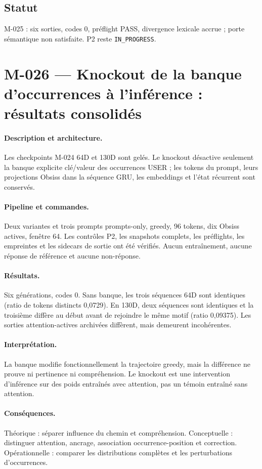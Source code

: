 \documentclass[11pt,a4paper]{report}
\begin{document}
\subsection{Statut}
M-025 : six sorties, codes 0, préflight PASS, divergence lexicale accrue ; porte sémantique non satisfaite. P2 reste \texttt{IN\_PROGRESS}.


\section{M-026 — Knockout de la banque d'occurrences à l'inférence : résultats consolidés}
\label{sec:m026-knockout-complete}
\paragraph{Description et architecture.} Les checkpoints M-024 64D et 130D sont gelés. Le knockout désactive seulement la banque explicite clé/valeur des occurrences USER ; les tokens du prompt, leurs projections Obsiss dans la séquence GRU, les embeddings et l'état récurrent sont conservés.
\paragraph{Pipeline et commandes.} Deux variantes et trois prompts prompts-only, greedy, 96 tokens, dix Obsiss actives, fenêtre 64. Les contrôles P2, les snapshots complets, les préflights, les empreintes et les sidecars de sortie ont été vérifiés. Aucun entraînement, aucune réponse de référence et aucune non-réponse.
\paragraph{Résultats.} Six générations, codes 0. Sans banque, les trois séquences 64D sont identiques (ratio de tokens distincts 0,0729). En 130D, deux séquences sont identiques et la troisième diffère au début avant de rejoindre le même motif (ratio 0,09375). Les sorties attention-actives archivées diffèrent, mais demeurent incohérentes.
\paragraph{Interprétation.} La banque modifie fonctionnellement la trajectoire greedy, mais la différence ne prouve ni pertinence ni compréhension. Le knockout est une intervention d'inférence sur des poids entraînés avec attention, pas un témoin entraîné sans attention.
\paragraph{Conséquences.} Théorique : séparer influence du chemin et compréhension. Conceptuelle : distinguer attention, ancrage, association occurrence-position et correction. Opérationnelle : comparer les distributions complètes et les perturbations d'occurrences.
\end{document}
